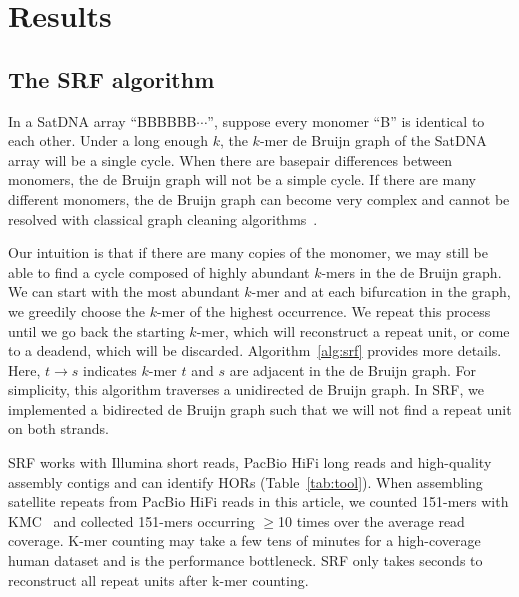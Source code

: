 \documentclass{bioinfo}
\begin{document}
\section{Results}

\subsection{The SRF algorithm}

In a SatDNA array ``{\sf BBBBBB$\cdots$}'', suppose every monomer ``{\sf B}''
is identical to each other. Under a long enough $k$, the $k$-mer de Bruijn
graph of the SatDNA array will be a single cycle.  When there are
basepair differences between monomers, the de Bruijn graph will not be a simple cycle.
If there are many different monomers, the de Bruijn graph can become very
complex and cannot be resolved with classical graph cleaning
algorithms~\citep{Zerbino:2008uq}.

Our intuition is that if there are many copies of the monomer, we may still be
able to find a cycle composed of highly abundant $k$-mers in the de Bruijn
graph. We can start with the most abundant $k$-mer and at each bifurcation in
the graph, we greedily choose the $k$-mer of the highest occurrence. We repeat
this process until we go back the starting $k$-mer, which will reconstruct a
repeat unit, or come to a deadend, which will be discarded.
Algorithm~\ref{alg:srf} provides more details. Here, $t\to s$ indicates $k$-mer
$t$ and $s$ are adjacent in the de Bruijn graph. For simplicity, this algorithm
traverses a unidirected de Bruijn graph. In SRF, we implemented a bidirected
de Bruijn graph such that we will not find a repeat unit on both strands.

SRF works with Illumina short reads, PacBio HiFi long reads and high-quality
assembly contigs and can identify HORs (Table~\ref{tab:tool}).  When assembling
satellite repeats from PacBio HiFi reads in this article, we counted 151-mers
with KMC~\citep{Kokot:2017aa} and collected 151-mers occurring $\ge$10 times
over the average read coverage. K-mer counting may take a few tens of minutes
for a high-coverage human dataset and is the performance bottleneck. SRF only
takes seconds to reconstruct all repeat units after k-mer counting.
\end{document}
